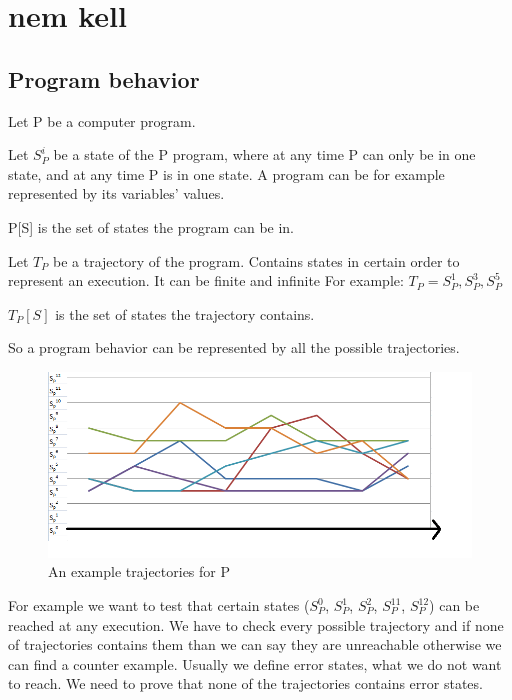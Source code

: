 \chapter{nem kell}
\label{sec:saai}

\section{Program behavior}
\label{sec:progbehavior}

Let P be a computer program.

Let $S_{P}^{i}$ be a state of the P program, where at any time P can only be in one state, and at any time P is in one state. A program can be for example represented by its variables' values.

P[S] is the set of states the program can be in.

Let $T_{P}$ be a trajectory of the program. Contains states in certain order to represent an execution.
It can be finite and infinite For example: $T_{P}={S_{P}^{1}, S_{P}^{3}, S_{P}^{5}}$

$T_{P}[S]$ is the set of states the trajectory contains.

So a program behavior can be represented by all the possible trajectories.

\begin{figure} [!ht]
	\centering
	\includegraphics[width=150mm, keepaspectratio]{figures/trajectory1.png}
	\caption{\label{fig:trajectory1}An example trajectories for P}
\end{figure}

For example we want to test that certain states ($S_{P}^{0}$, $S_{P}^{1}$, $S_{P}^{2}$, $S_{P}^{11}$, $S_{P}^{12}$) can be reached at any execution. We have to check every possible trajectory and if none of trajectories contains them than we can say they are unreachable otherwise we can find a counter example. Usually we define error states, what we do not want to reach. We need to prove that none of the trajectories contains error states. 

